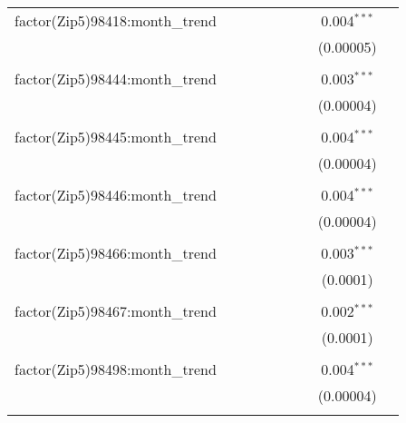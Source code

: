 \begin{table}[H]
{\begin{tabular}{@{\extracolsep{5pt}}lcccccccc}
  factor(Zip5)98418:month\_trend &  &  &  &  &  &  & 0.004$^{***}$ &  \\  

   &  &  &  &  &  &  & (0.00005) &  \\  

   & & & & & & & & \\  

  factor(Zip5)98444:month\_trend &  &  &  &  &  &  & 0.003$^{***}$ &  \\  

   &  &  &  &  &  &  & (0.00004) &  \\  

   & & & & & & & & \\  

  factor(Zip5)98445:month\_trend &  &  &  &  &  &  & 0.004$^{***}$ &  \\  

   &  &  &  &  &  &  & (0.00004) &  \\  

   & & & & & & & & \\  

  factor(Zip5)98446:month\_trend &  &  &  &  &  &  & 0.004$^{***}$ &  \\  

   &  &  &  &  &  &  & (0.00004) &  \\  

   & & & & & & & & \\  

  factor(Zip5)98466:month\_trend &  &  &  &  &  &  & 0.003$^{***}$ &  \\  

   &  &  &  &  &  &  & (0.0001) &  \\  

   & & & & & & & & \\  

  factor(Zip5)98467:month\_trend &  &  &  &  &  &  & 0.002$^{***}$ &  \\  

   &  &  &  &  &  &  & (0.0001) &  \\  

   & & & & & & & & \\  

  factor(Zip5)98498:month\_trend &  &  &  &  &  &  & 0.004$^{***}$ &  \\  

   &  &  &  &  &  &  & (0.00004) &  \\  

   & & & & & & & & \\  


\end{tabular}}
\end{table}
